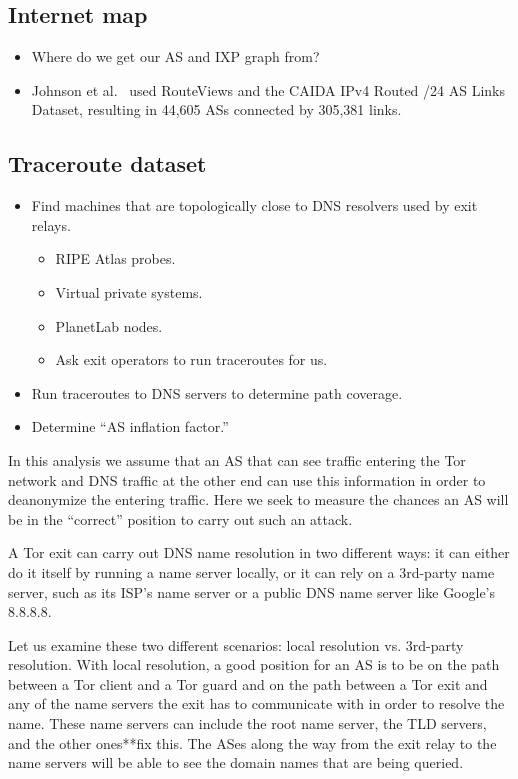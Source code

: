\subsection{Internet map}
\begin{itemize}
	\item Where do we get our AS and IXP graph from?
	\item Johnson et al.~\cite[\S 5.2]{Johnson2013a} used RouteViews and the CAIDA IPv4
		Routed /24 AS Links Dataset, resulting in 44,605 ASs connected by
		305,381 links.
\end{itemize}

\subsection{Traceroute dataset}
\label{sec:traceroute-dataset}
\begin{itemize}
	\item Find machines that are topologically close to DNS resolvers
		used by exit relays.
	\begin{itemize}
		\item RIPE Atlas probes.
		\item Virtual private systems.
		\item PlanetLab nodes.
		\item Ask exit operators to run traceroutes for us.
	\end{itemize}
	\item Run traceroutes to DNS servers to determine path coverage.
	\item Determine ``AS inflation factor.''
\end{itemize}

In this analysis we assume that an AS that can see traffic entering the Tor network and 
DNS traffic at the other end can use this information in order to deanonymize the 
entering traffic. Here we seek to measure the chances an AS will be in the ``correct'' 
position to carry out such an attack.

A Tor exit can carry out DNS name resolution in two different ways: it can either do it
itself by running a name server locally, or it can rely on a 3rd-party name server, 
such as its ISP's name server or a public DNS name server like Google's 8.8.8.8.

Let us examine these two different scenarios: local resolution vs. 3rd-party 
resolution. With local resolution, a good position for an AS is to be on the path between 
a Tor client and a Tor guard and on the path between a Tor exit and any of the name 
servers the exit has to communicate with in order to resolve the name. These name servers 
can include the root name server, the TLD servers, and the other ones**fix this. The ASes 
along the way from the exit relay to the name servers will be able to see the domain 
names that are being queried.

